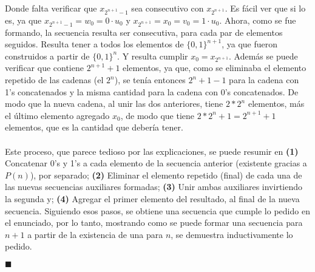 \documentclass[letter]{article}
\begin{document}
\begin{pregunta}{2}
		Donde falta verificar que $x_{2^{n+1}-1}$ sea consecutivo con $x_{2^{n+1}}$. Es fácil ver que si lo es, ya que $x_{2^{n+1}-1} = w_0 = 0\cdot u_0$ y $x_{2^{n+1}}= x_0 = v_0 = 1\cdot u_0$.
		Ahora, como se fue formando, la secuencia resulta ser consecutiva, para cada par de elementos seguidos. Resulta tener a todos los elementos de $\{0,1\}^{n+1}$, ya que fueron construidos a partir de $\{0,1\}^n$. Y resulta cumplir $x_0=x_{2^{n+1}}$. Además se puede verificar que contiene $2^{n+1}+1$ elementos, ya que, como se eliminaba el elemento repetido de las cadenas (el $2^n$), se tenía entonces $2^n + 1 - 1$ para la cadena con 1's concatenados y la misma cantidad para la cadena con 0's concatenados. De modo que la nueva cadena, al unir las dos anteriores, tiene $2*2^n$ elementos, más el último elemento agregado $x_0$, de modo que tiene $2*2^n+1 = 2^{n+1}+1$ elementos, que es la cantidad que debería tener.\\\\
		Este proceso, que parece tedioso por las explicaciones, se puede resumir en \textbf{(1)} Concatenar 0's y 1's a cada elemento de la secuencia anterior (existente gracias a $P(n)$), por separado; \textbf{(2)} Eliminar el elemento repetido (final) de cada una de las nuevas secuencias auxiliares formadas; \textbf{(3)} Unir ambas auxiliares invirtiendo la segunda y; \textbf{(4)} Agregar el primer elemento del resultado, al final de la nueva secuencia.
		Siguiendo esos pasos, se obtiene una secuencia que cumple lo pedido en el enunciado, por lo tanto, mostrando como se puede formar una secuencia para $n+1$ a partir de la existencia de una para $n$, se demuestra inductivamente lo pedido.\begin{flushright}$\blacksquare$\end{flushright}

	\end{pregunta}
\end{document}
